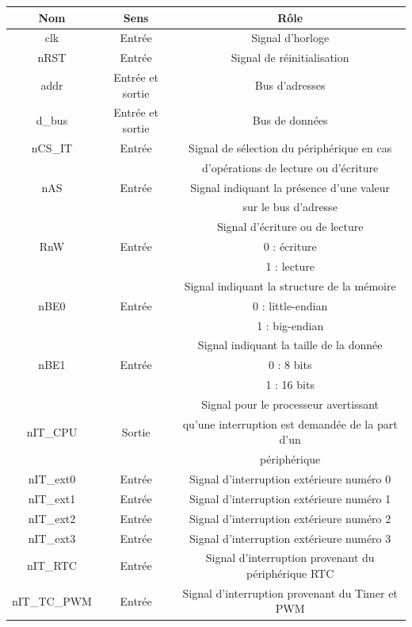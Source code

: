 \begin{table}[H]
	\centering
	\begin{tabular}{|c|c|c|}
		\hline
		Nom & Sens & Rôle\\
		\hline
		clk & Entrée & Signal d'horloge\\
		\hline
		nRST & Entrée & Signal de réinitialisation\\
		\hline
		addr & Entrée et sortie & Bus d'adresses\\
		\hline
		d\_bus & Entrée et sortie & Bus de données\\
		\hline
		nCS\_IT & Entrée & Signal de sélection du périphérique en cas \\
		& & d'opérations de lecture ou d'écriture\\
		\hline
		nAS & Entrée & Signal indiquant la présence d'une valeur\\
		& & sur le bus d'adresse\\
		\hline
		& & Signal d'écriture ou de lecture\\
		RnW & Entrée & 0 : écriture\\
		& & 1 : lecture\\
		\hline
		 & & Signal indiquant la structure de la mémoire\\
		nBE0 & Entrée & 0 : little-endian\\
		& & 1 : big-endian\\
		\hline
		& & Signal indiquant la taille de la donnée\\
		nBE1 & Entrée & 0 : 8 bits\\
		 & & 1 : 16 bits\\
		\hline
		 &  & Signal pour le processeur avertissant \\
		nIT\_CPU & Sortie & qu'une interruption est demandée de la part d'un \\
		& & périphérique\\
		\hline
		nIT\_ext0 & Entrée & Signal d'interruption extérieure numéro 0\\
		\hline
		nIT\_ext1 & Entrée & Signal d'interruption extérieure numéro 1\\
		\hline
		nIT\_ext2 & Entrée & Signal d'interruption extérieure numéro 2\\
		\hline
		nIT\_ext3 & Entrée & Signal d'interruption extérieure numéro 3\\
		\hline
		nIT\_RTC & Entrée & Signal d'interruption provenant du périphérique RTC\\
		\hline
		nIT\_TC\_PWM & Entrée & Signal d'interruption provenant du Timer et PWM\\

\end{tabular}
\end{table}
